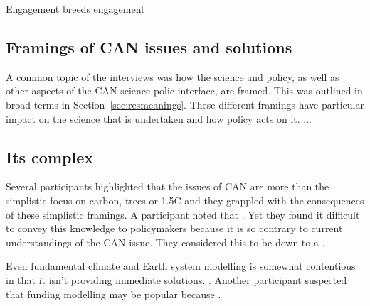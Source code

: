 Engagement breeds engagement

\subsection{Framings of CAN issues and solutions}
A common topic of the interviews was how the science and policy, as well as other aspects of the CAN science-polic interface, are framed. This was outlined in broad terms in Section~\ref{sec:resmeanings}. These different framings have particular impact on the science that is undertaken and how policy acts on it. ...

\subsection{Its complex}
Several participants highlighted that the issues of CAN are more than the simplistic focus on carbon, trees or 1.5\degree C and they grappled with the consequences of these simplistic framings. A participant noted that . Yet they found it difficult to convey this knowledge to policymakers because it is so contrary to current understandings of the CAN issue. They considered this to be down to a . 

Even fundamental climate and Earth system modelling is somewhat contentious in that it isn't providing immediate solutions. . Another participant suspected that funding modelling may be popular because .

